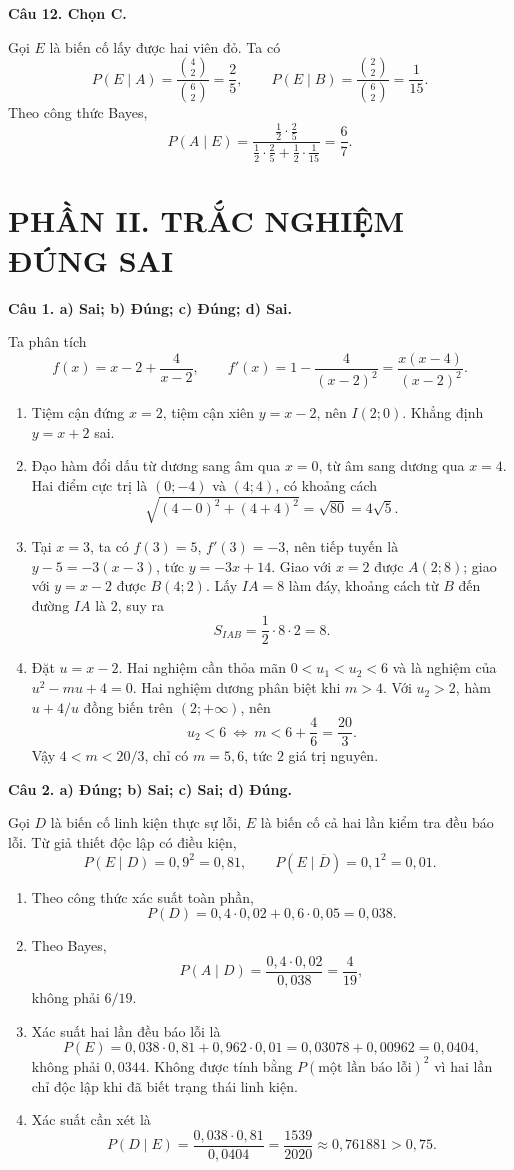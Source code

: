 \documentclass[12pt,a4paper]{article}
\newcommand{\loigiai}[1]{\par\medskip\Needspace{4\baselineskip}\noindent\textbf{#1}\par\nobreak}
\begin{document}
\loigiai{Câu 12. Chọn C.}
Gọi $E$ là biến cố lấy được hai viên đỏ. Ta có
\[
P(E\mid A)=\frac{\binom42}{\binom62}=\frac25,
\qquad P(E\mid B)=\frac{\binom22}{\binom62}=\frac1{15}.
\]
Theo công thức Bayes,
\[
P(A\mid E)=\frac{\frac12\cdot\frac25}
{\frac12\cdot\frac25+\frac12\cdot\frac1{15}}=\frac67.
\]

\section*{\large PHẦN II. TRẮC NGHIỆM ĐÚNG SAI}
\loigiai{Câu 1. a) Sai; b) Đúng; c) Đúng; d) Sai.}
Ta phân tích
\[
f(x)=x-2+\frac4{x-2},\qquad
f'(x)=1-\frac4{(x-2)^2}=\frac{x(x-4)}{(x-2)^2}.
\]
\begin{enumerate}[label=\alph*),leftmargin=*]
\item Tiệm cận đứng $x=2$, tiệm cận xiên $y=x-2$, nên $I(2;0)$. Khẳng định $y=x+2$ sai.
\item Đạo hàm đổi dấu từ dương sang âm qua $x=0$, từ âm sang dương qua $x=4$. Hai điểm cực trị là $(0;-4)$ và $(4;4)$, có khoảng cách
\[
\sqrt{(4-0)^2+(4+4)^2}=\sqrt{80}=4\sqrt5.
\]
\item Tại $x=3$, ta có $f(3)=5$, $f'(3)=-3$, nên tiếp tuyến là $y-5=-3(x-3)$, tức $y=-3x+14$. Giao với $x=2$ được $A(2;8)$; giao với $y=x-2$ được $B(4;2)$. Lấy $IA=8$ làm đáy, khoảng cách từ $B$ đến đường $IA$ là $2$, suy ra
\[
S_{IAB}=\frac12\cdot8\cdot2=8.
\]
\item Đặt $u=x-2$. Hai nghiệm cần thỏa mãn $0<u_1<u_2<6$ và là nghiệm của $u^2-mu+4=0$. Hai nghiệm dương phân biệt khi $m>4$. Với $u_2>2$, hàm $u+4/u$ đồng biến trên $(2;+\infty)$, nên
\[
u_2<6\ \Longleftrightarrow\ m<6+\frac46=\frac{20}3.
\]
Vậy $4<m<20/3$, chỉ có $m=5,6$, tức $2$ giá trị nguyên.
\end{enumerate}

\loigiai{Câu 2. a) Đúng; b) Sai; c) Sai; d) Đúng.}
Gọi $D$ là biến cố linh kiện thực sự lỗi, $E$ là biến cố cả hai lần kiểm tra đều báo lỗi. Từ giả thiết độc lập có điều kiện,
\[
P(E\mid D)=0{,}9^2=0{,}81,\qquad
P(E\mid\overline D)=0{,}1^2=0{,}01.
\]
\begin{enumerate}[label=\alph*),leftmargin=*]
\item Theo công thức xác suất toàn phần,
\[
P(D)=0{,}4\cdot0{,}02+0{,}6\cdot0{,}05=0{,}038.
\]
\item Theo Bayes,
\[
P(A\mid D)=\frac{0{,}4\cdot0{,}02}{0{,}038}=\frac4{19},
\]
không phải $6/19$.
\item Xác suất hai lần đều báo lỗi là
\[
P(E)=0{,}038\cdot0{,}81+0{,}962\cdot0{,}01
=0{,}03078+0{,}00962=0{,}0404,
\]
không phải $0{,}0344$. Không được tính bằng $P(\text{một lần báo lỗi})^2$ vì hai lần chỉ độc lập khi đã biết trạng thái linh kiện.
\item Xác suất cần xét là
\[
P(D\mid E)=\frac{0{,}038\cdot0{,}81}{0{,}0404}
=\frac{1539}{2020}\approx0{,}761881>0{,}75.
\]
\end{enumerate}
\end{document}
